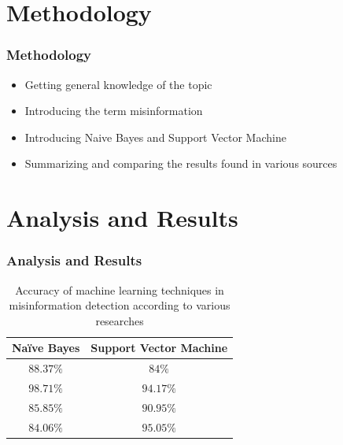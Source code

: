 \documentclass{beamer}
\begin{document}
\section{Methodology}

\begin{frame}[fragile=singleslide]\frametitle{Methodology}
\begin{itemize}[label=$\bullet$]
\item Getting general knowledge of the topic
\item Introducing the term misinformation 
\item Introducing Naive Bayes and Support Vector Machine
\item Summarizing and comparing the results found in various sources
\end{itemize}
\end{frame}

\section{Analysis and Results}

\begin{frame}[fragile=singleslide]\frametitle{Analysis and Results}
\begin{table}[H]
\centering
\begin{tabular}{||c c||} 
 \hline
Naïve Bayes & Support Vector Machine\\ [0.5ex] 
 \hline\hline
 $88.37\%$ & $84\%$  \\
 \hline
 $98.71\%$ & $94.17\%$  \\
 \hline
 $85.85\%$ & $90.95\%$  \\
 \hline
 $84.06\%$ & $95.05\%$  \\ [1ex]
 \hline
\end{tabular}
\caption{\centering Accuracy of machine learning techniques in misinformation detection according to various researches}
\label{table:results}
\end{table}
\end{frame}
\end{document}
